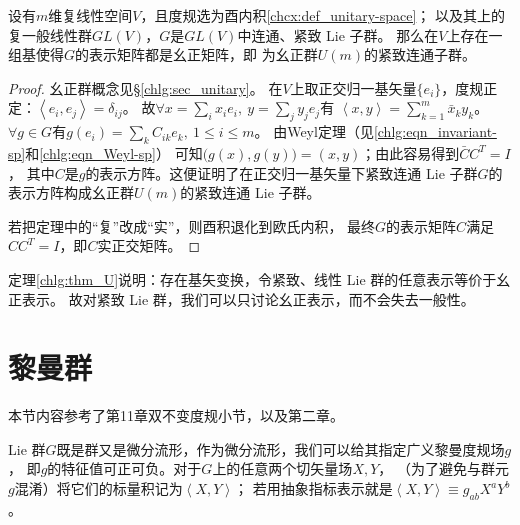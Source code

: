 \begin{theorem}\label{chlg:thm_U}
    设有$m$维复线性空间$V$，且度规选为酉内积\ref{chcx:def_unitary-space}；
    以及其上的复一般线性群$GL(V)$，$G$是$GL(V)$中连通、紧致 Lie 子群。
    那么在$V$上存在一组基使得$G$的表示矩阵都是幺正矩阵，即
    为幺正群$U(m)$的紧致连通子群。
\end{theorem}
\begin{proof}
    幺正群概念见\S\ref{chlg:sec_unitary}。
    在$V$上取正交归一基矢量$\{e_i\}$，度规正定：$\left<e_i,e_j\right>=\delta_{ij}$。
    故$\forall x = \sum_i x_i e_i,\ y=\sum_j y_j e_j$有
    $\left<x,y\right>= \sum_{k=1}^{m} \bar{x}_k y_k $。
    $\forall g\in G$有$g(e_i)=\sum_k  C_{ik}e_k, \ 1\leqslant i \leqslant m$。
    由Weyl定理（见\eqref{chlg:eqn_invariant-sp}和\eqref{chlg:eqn_Weyl-sp}）
    可知$\bigl(g(x),g(y)\bigr) = (x,y)$；由此容易得到$\bar{C} C^T = I$，
    其中$C$是$g$的表示方阵。这便证明了在正交归一基矢量下紧致连通
     Lie 子群$G$的表示方阵构成幺正群$U(m)$的紧致连通 Lie 子群。
    
    若把定理中的“复”改成“实”，则酉积退化到欧氏内积，
    最终$G$的表示矩阵$C$满足$CC^T=I$，即$C$实正交矩阵。   
\end{proof}

定理\ref{chlg:thm_U}说明：存在基矢变换，令紧致、线性 Lie 群的任意表示等价于幺正表示。
故对紧致 Lie 群，我们可以只讨论幺正表示，而不会失去一般性。








\section{黎曼群}\label{chlg:sec_bi-invariant-metric}
本节内容参考了\parencite{oneill1983}第11章双不变度规小节，以及\parencite{Alexandrino-2015}第二章。   

 Lie 群$G$既是群又是微分流形，作为微分流形，我们可以给其指定广义黎曼度规场$g$，
即$g$的特征值可正可负。对于$G$上的任意两个切矢量场$X,Y$，
（为了避免与群元$g$混淆）将它们的标量积记为$\left<X,Y\right>$；
若用抽象指标表示就是$\left<X,Y\right>\equiv g_{ab}X^a Y^b$。


